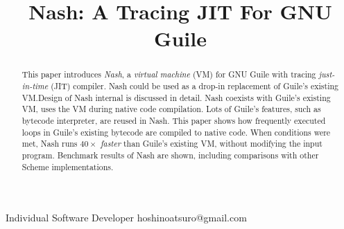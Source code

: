 \documentclass[preprint, 10pt]{sigplanconf}
\begin{document}
\setlength{\pdfpageheight}{\paperheight}
\setlength{\pdfpagewidth}{\paperwidth}




\title{Nash: A Tracing JIT For GNU Guile}

           {Individual Software Developer}
           {hoshinoatsuro@gmail.com}

\maketitle

\begin{abstract}

This paper introduces \textit{Nash}, a \textit{virtual machine} (VM) for GNU
Guile with tracing \textit{just-in-time} (JIT) compiler. Nash could be used as a
drop-in replacement of Guile's existing VM.\@ Design of Nash internal is
discussed in detail. Nash coexists with Guile's existing VM, uses the VM during
native code compilation. Lots of Guile's features, such as bytecode interpreter,
are reused in Nash. This paper shows how frequently executed loops in Guile's
existing bytecode are compiled to native code. When conditions were met, Nash
runs \textit{$40\times$ faster} than Guile's existing VM, without modifying the
input program. Benchmark results of Nash are shown, including comparisons with
other Scheme implementations.




\end{abstract}

\end{document}
